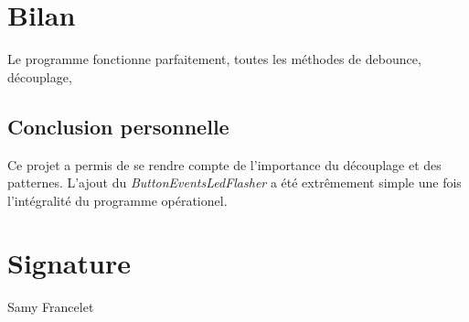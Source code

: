 \section{Bilan}
Le programme fonctionne parfaitement, toutes les méthodes de debounce, découplage,

\begin{summary}
\section{Conclusion personnelle}
Ce projet a permis de se rendre compte de l'importance du découplage
et des patternes. L'ajout du \emph{ButtonEventsLedFlasher} a été
extrêmement simple une fois l'intégralité du programme opérationel.
\end{summary}

\section{Signature}
Samy Francelet